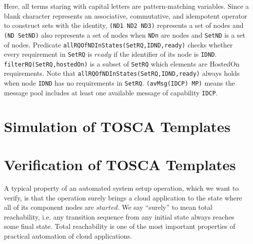 \documentclass[12pt]{report}
\newcommand{\stt}[1]{{\small{\tt {#1}}}}
\begin{document}
\normalsize
Here, all terms staring with capital letters are pattern-matching
variables. Since a blank character represents an associative,
commutative, and idempotent operator to construct sets with the
identity, \stt{(ND1 ND2 ND3)} represents a set of nodes and
\stt{(ND SetND)} also represents a set of nodes when
{\tt NDn} are nodes and {\tt SetND} is a set of nodes.  Predicate
\stt{allRQOfNDInStates(SetRQ,IDND,ready)} checks whether every
requirement in {\tt SetRQ} is $ready$ if the identifier of its
node is {\tt IDND}. \stt{filterRQ(SetRQ,hostedOn)} is a subset of
{\tt SetRQ} which elements are HostedOn requirements.
Note that \stt{allRQOfNDInStates(SetRQ,IDND,ready)} always holds
when node {\tt IDND} has no requirements in {\tt SetRQ}.
\stt{(avMsg(IDCP) MP)} means the message pool includes at least
one available message of capability {\tt IDCP}.
\section{Simulation of TOSCA Templates}
\label{sec:TOSCAsimulation}
\section{Verification of TOSCA Templates}
\label{sec:TOSCAverification}
A typical property of an automated system setup operation, which we
want to verify, is that the operation surely brings a cloud
application to the state where all of its component nodes are $started$.
We say ``surely'' to mean total reachability, i.e. any transition
sequence from any initial state always reaches some final state. Total
reachability is one of the most important properties of practical
automation of cloud applications.
\end{document}
